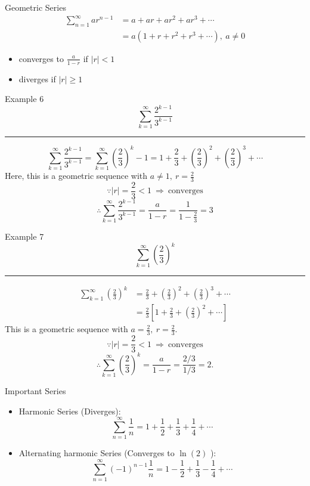 \documentclass[12pt,a4paper]{article}
\begin{document}
\begin{rmk}{Geometric Series}
	$$\begin{aligned}
		\sum^\infty_{n=1}ar^{n-1}&=a+ar+ar^2+ar^3+\cdots\\
		&=a(1+r+r^2+r^3+\cdots),\ a\neq0
	\end{aligned}$$	
	\begin{itemize}
		\item converges to $\displaystyle\frac{a}{1-r}$ if $|r|<1$	
		\item diverges if $|r|\geq1$
	\end{itemize}
\end{rmk}
\begin{eg}{Example 6}
	$$\sum^\infty_{k=1}\frac{2^{k-1}}{3^{k-1}}$$	
	\noindent\rule[0.25\baselineskip]{\textwidth}{1pt}
	$$\sum_{k=1}^\infty\frac{2^{k-1}}{3^{k-1}}=\sum_{k=1}^\infty\left(\frac{2}{3}\right)^k-1=1+\frac{2}{3}+\left(\frac{2}{3}\right)^2+\left(\frac{2}{3}\right)^3+\cdots$$
	Here, this is a geometric sequence with $\displaystyle a\neq1,\ r=\frac{2}{3}$
	$$\because|r|=\frac{2}{3}<1\ \Rightarrow\ \text{converges}$$
	$$\therefore\sum_{k=1}^\infty\frac{2^{k-1}}{3^{k-1}}=\frac{a}{1-r}=\frac{1}{1-\frac{2}{3}}=3$$
\end{eg}
\begin{eg}{Example 7}
	$$\sum^\infty_{k=1}\left(\frac{2}{3}\right)^k$$
	\noindent\rule[0.25\baselineskip]{\textwidth}{1pt}
	$$\begin{aligned}
		\sum^\infty_{k=1}\left(\frac{2}{3}\right)^k&=\frac{2}{3}+\left(\frac{2}{3}\right)^2+\left(\frac{2}{3}\right)^3+\cdots\\
		&=\frac{2}{3}\left[1+\frac{2}{3}+\left(\frac{2}{3}\right)^2+\cdots\right]
	\end{aligned}$$
	This is a geometric sequence with $\displaystyle a=\frac{2}{3},\ r=\frac{2}{3}$.
	$$\because|r|=\frac{2}{3}<1\ \Rightarrow\ \text{converges}$$
	$$\therefore\sum^\infty_{k=1}\left(\frac{2}{3}\right)^k=\frac{a}{1-r}=\frac{2/3}{1/3}=2.$$
\end{eg}
\begin{rmk}{Important Series}
	\begin{itemize}
		\item Harmonic Series (Diverges): $$\sum^\infty_{n=1}\frac{1}{n}=1+\frac{1}{2}+\frac{1}{3}+\frac{1}{4}+\cdots$$
		\item Alternating harmonic Series (Converges to $\ln(2)$	): $$\sum^\infty_{n=1}(-1)^{n-1}\frac{1}{n}=1-\frac{1}{2}+\frac{1}{3}-\frac{1}{4}+\cdots$$
	\end{itemize}
\end{rmk}
\end{document}
